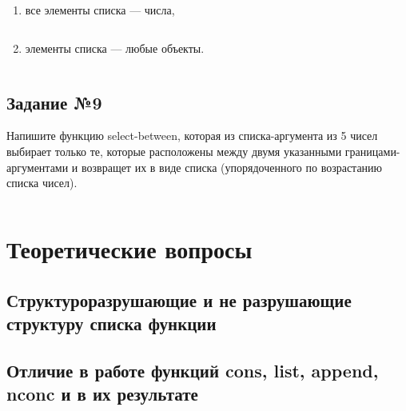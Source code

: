 \begin{enumerate}
    \item все элементы списка --- числа,

\vspace{4mm}
\begin{minipage}{0.92\linewidth}
\begin{lstlisting}
\end{lstlisting}
\end{minipage}

    \item элементы списка --- любые объекты.

\vspace{4mm}
\begin{minipage}{0.92\linewidth}
\begin{lstlisting}
\end{lstlisting}
\end{minipage}

\end{enumerate}

\section{Задание №9}

Напишите функцию select-between, которая из списка-аргумента из 5 чисел
выбирает только те, которые расположены между двумя указанными
границами-аргументами и возвращет их в виде списка (упорядоченного по
возрастанию списка чисел).

\vspace{4mm}
\begin{minipage}{0.92\linewidth}
\begin{lstlisting}
\end{lstlisting}
\end{minipage}

\chapter{Теоретические вопросы}

\section{Структуроразрушающие и не разрушающие структуру списка
функции}

\section{Отличие в работе функций cons, list, append, nconc и в их результате}
